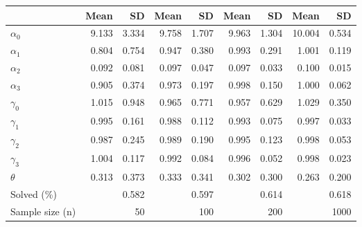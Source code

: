 
\begin{tabular}[t]{lrrrrrrrr}
\toprule
  & Mean & SD & Mean  & SD  & Mean   & SD   & Mean    & SD   \\
\midrule
$\alpha_{0}$ & 9.133 & 3.334 & 9.758 & 1.707 & 9.963 & 1.304 & 10.004 & 0.534\\
$\alpha_{1}$ & 0.804 & 0.754 & 0.947 & 0.380 & 0.993 & 0.291 & 1.001 & 0.119\\
$\alpha_{2}$ & 0.092 & 0.081 & 0.097 & 0.047 & 0.097 & 0.033 & 0.100 & 0.015\\
$\alpha_{3}$ & 0.905 & 0.374 & 0.973 & 0.197 & 0.998 & 0.150 & 1.000 & 0.062\\
$\gamma_{0}$ & 1.015 & 0.948 & 0.965 & 0.771 & 0.957 & 0.629 & 1.029 & 0.350\\
$\gamma_{1}$ & 0.995 & 0.161 & 0.988 & 0.112 & 0.993 & 0.075 & 0.997 & 0.033\\
$\gamma_{2}$ & 0.987 & 0.245 & 0.989 & 0.190 & 0.995 & 0.123 & 0.998 & 0.053\\
$\gamma_{3}$ & 1.004 & 0.117 & 0.992 & 0.084 & 0.996 & 0.052 & 0.998 & 0.023\\
$\theta$ & 0.313 & 0.373 & 0.333 & 0.341 & 0.302 & 0.300 & 0.263 & 0.200\\
Solved (\%) &  & 0.582 &  & 0.597 &  & 0.614 &  & 0.618\\
Sample size (n) &  & 50 &  & 100 &  & 200 &  & 1000\\
\bottomrule
\end{tabular}
